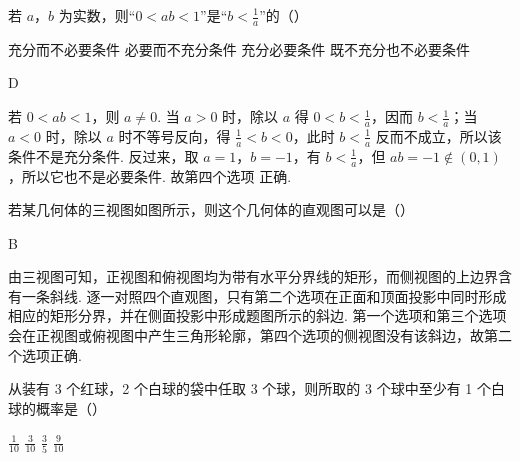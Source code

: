 \begin{problem}
若 \(a\)，\(b\) 为实数，则“\(0 < ab < 1\)”是“\(b < \frac{1}{a}\)”的（\quad）

\choices
    {充分而不必要条件}
    {必要而不充分条件}
    {充分必要条件}
    {既不充分也不必要条件}
\end{problem}

\begin{answer}
D
\end{answer}

\begin{solution}
若 \(0<ab<1\)，则 \(a\neq 0\). 当 \(a>0\) 时，除以 \(a\) 得 \(0<b<\frac1a\)，因而 \(b<\frac1a\)；当 \(a<0\) 时，除以 \(a\) 时不等号反向，得 \(\frac1a<b<0\)，此时 \(b<\frac1a\) 反而不成立，所以该条件不是充分条件. 反过来，取 \(a=1\)，\(b=-1\)，有 \(b<\frac1a\)，但 \(ab=-1\notin(0,1)\)，所以它也不是必要条件. 故第四个选项 正确.
\end{solution}

\begin{problem}
若某几何体的三视图如图所示，则这个几何体的直观图可以是（\quad）


    {}
    {}
    {}
\end{problem}

\begin{answer}
B
\end{answer}

\begin{solution}
由三视图可知，正视图和俯视图均为带有水平分界线的矩形，而侧视图的上边界含有一条斜线. 逐一对照四个直观图，只有第二个选项在正面和顶面投影中同时形成相应的矩形分界，并在侧面投影中形成题图所示的斜边. 第一个选项和第三个选项会在正视图或俯视图中产生三角形轮廓，第四个选项的侧视图没有该斜边，故第二个选项正确.
\end{solution}

\begin{problem}
从装有 3 个红球，2 个白球的袋中任取 3 个球，则所取的 3 个球中至少有 1 个白球的概率是（\quad）

\choices
    {\( \frac{1}{10} \)}
    {\( \frac{3}{10} \)}
    {\( \frac{3}{5} \)}
    {\( \frac{9}{10} \)}
\end{problem}

